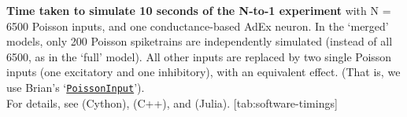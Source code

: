 \begin{table}[h]
    \vspace*{3em}
    \begin{sidecaption}
        {\textbf{Time taken to simulate 10 seconds of the N-to-1 experiment}
        {\small with N = 6500 Poisson inputs, and one conductance-based AdEx neuron. In the `merged' models, only 200 Poisson spiketrains are independently simulated (instead of all 6500, as in the `full' model). All other inputs are replaced by two single Poisson inputs (one excitatory and one inhibitory), with an equivalent effect. (That is, we use Brian's `\texttt{\href{https://brian2.readthedocs.io/en/stable/user/input.html\#efficient-poisson-inputs-via-poissoninput}{PoissonInput}}').\\
        For details, see  (Cython),  (C++), and  (Julia).}
        }
        [tab:software-timings]
    \end{sidecaption}
\end{table}
